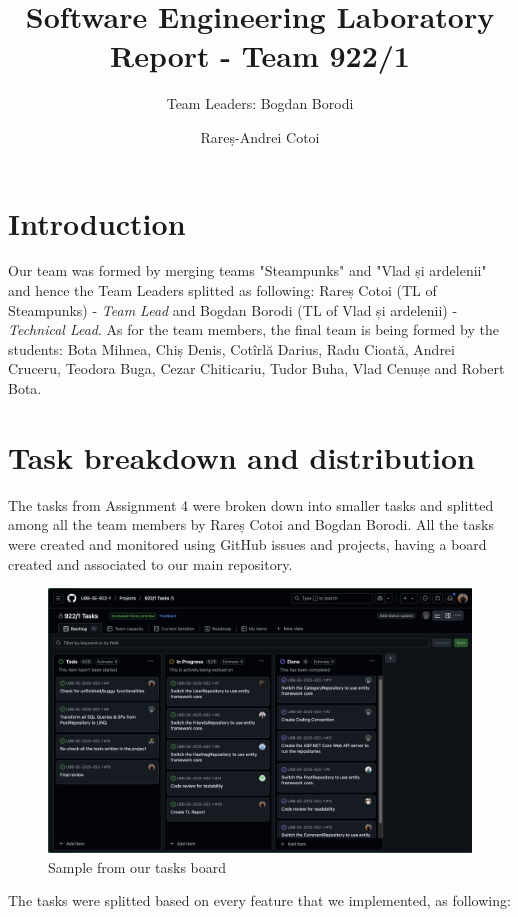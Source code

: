 \documentclass[9pt,a4paper,twocolumn,twoside]{tau-class/tau}
\title{Software Engineering Laboratory Report - Team 922/1}
\author[1]{Team Leaders: Bogdan Borodi}
\author[1]{Rareș-Andrei Cotoi}
\affil[1]{2nd Year, Group 922/1}
\begin{document}
		
    \maketitle 
    \thispagestyle{firststyle} 
    

\section{Introduction}
Our team was formed by merging teams "Steampunks" and "Vlad și ardelenii" and hence the Team Leaders splitted as following: Rareș Cotoi (TL of Steampunks) - \textit{Team Lead} and Bogdan Borodi (TL of Vlad și ardelenii) - \textit{Technical Lead}. As for the team members, the final team is being formed by the students: Bota Mihnea, Chiș Denis, Cotîrlă Darius, Radu Cioată, Andrei Cruceru, Teodora Buga, Cezar Chiticariu, Tudor Buha, Vlad Cenușe and Robert Bota.

\section{Task breakdown and distribution}
The tasks from Assignment 4 were broken down into smaller tasks and splitted among all the team members by Rareș Cotoi and Bogdan Borodi. All the tasks were created and monitored using GitHub issues and projects, having a board created and associated to our main repository.
\begin{figure}[H]
\includegraphics[width=0.9\columnwidth]{backlog.png}
\centering
\caption{Sample from our tasks board}
\end{figure}
The tasks were splitted based on every feature that we implemented, as following:
\end{document}

